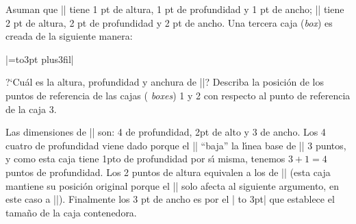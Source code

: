 


\bigskip

\enunciadoS Asuman que || tiene 1 pt de altura, 1 pt de
profundidad y 1 pt de ancho; || tiene 2 pt de altura, 2 pt de
profundidad y 2 pt de ancho. Una tercera caja ({\it box}) es creada de
la siguiente manera:

\medskip

|=\hbox to3pt{\hfil{}\hskip-3pt plus3fil}|

\medskip

\noindent ?`Cu\'al es la altura, profundidad y anchura de ||?
Describa la posici\'on de los puntos de referencia de las cajas ({\it
boxes}) 1 y 2 con respecto al punto de referencia de la caja 3.

\bigskip

\respuestaS Las dimensiones de || son: 4 de profundidad, 2pt de
alto y 3 de ancho. Los 4 cuatro de profundidad viene dado porque el
|| ``baja'' la l\'{\i}nea base de || 3 puntos, y como
esta caja tiene 1pto de profundidad por s\'{\i} misma, tenemos $3 + 1
= 4$ puntos de profundidad. Los 2 puntos de altura equivalen a los de
|| (esta caja mantiene su posici\'on original porque el |\lower|
solo afecta al siguiente argumento, en este caso a
||). Finalmente los 3 pt de ancho es por el |\hbox{} to 3pt| que
establece el tama\~no de la caja contenedora.

\bye

